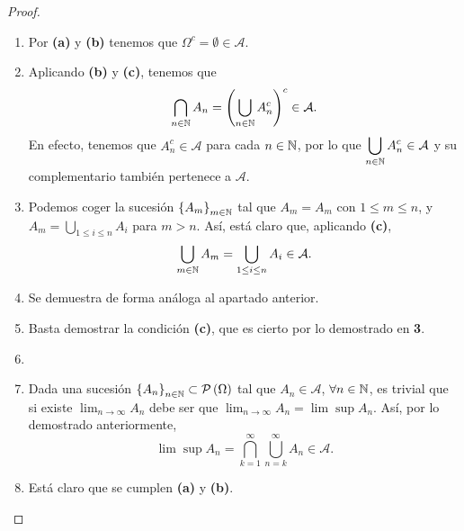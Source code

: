 \begin{proof}
\begin{enumerate}
\item Por \textbf{(a)} y \textbf{(b)} tenemos que $\displaystyle \Omega ^{c} = \emptyset \in \mathcal{A} $.
\item Aplicando \textbf{(b)} y \textbf{(c)}, tenemos que 
	\[ \bigcap_{n \in \mathbb{N}}A_{n} = \left(\bigcup_{n \in \mathbb{N}}A_{n}^{c} \right) ^{c}\in \mathcal{A} .\]
En efecto, tenemos que $\displaystyle A_{n}^{c} \in \mathcal{A} $ para cada $\displaystyle n \in \mathbb{N} $, por lo que $\displaystyle \bigcup_{n \in \mathbb{N}}A_{n}^{c} \in \mathcal{A}$ y su complementario también pertenece a $\displaystyle \mathcal{A} $.
\item Podemos coger la sucesión $\displaystyle \left\{ A_{m}\right\} _{m\in\mathbb{N}} $ tal que $\displaystyle A_{m} = A_{m} $ con $\displaystyle 1\leq m \leq n $, y $\displaystyle A_{m} = \bigcup_{1 \leq i \leq n}A_{i} $ para $\displaystyle m > n $. Así, está claro que, aplicando \textbf{(c)},
	\[\bigcup_{m \in \mathbb{N}}A_{m} = \bigcup_{1 \leq i \leq n}A_{i} \in \mathcal{A} .\]
\item Se demuestra de forma análoga al apartado anterior.	
\item Basta demostrar la condición \textbf{(c)}, que es cierto por lo demostrado en \textbf{3}.
\item 
\item Dada una sucesión $\displaystyle \left\{ A_{n}\right\} _{n\in\mathbb{N}} \subset \mathcal{P}\left(\Omega \right) $ tal que $\displaystyle A_{n} \in \mathcal{A} $, $\displaystyle \forall n \in \mathbb{N} $, es trivial que si existe $\displaystyle \lim_{n \to \infty}A_{n} $ debe ser que $\displaystyle \lim_{n \to \infty}A_{n} = \lim \sup A_{n} $. Así, por lo demostrado anteriormente, 
	\[\lim \sup A_{n} = \bigcap_{k = 1}^{\infty}\bigcup_{n = k}^{\infty}A_{n} \in \mathcal{A} .\]
\item Está claro que se cumplen \textbf{(a)} y \textbf{(b)}. 	
\end{enumerate}

\end{proof}

